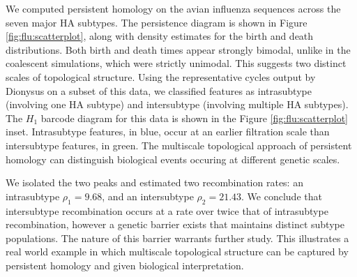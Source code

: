 We computed persistent homology on the avian influenza sequences across the seven major HA subtypes.
The persistence diagram is shown in Figure \ref{fig:flu:scatterplot}, along with density estimates for the birth and death distributions.
Both birth and death times appear strongly bimodal, unlike in the coalescent simulations, which were strictly unimodal.
This suggests two distinct scales of topological structure.
Using the representative cycles output by Dionysus on a subset of this data, we classified features as intrasubtype (involving one HA subtype) and intersubtype (involving multiple HA subtypes).
The $H_1$ barcode diagram for this data is shown in the Figure \ref{fig:flu:scatterplot} inset.
Intrasubtype features, in blue, occur at an earlier filtration scale than intersubtype features, in green.
The multiscale topological approach of persistent homology can distinguish biological events occuring at different genetic scales.

We isolated the two peaks and estimated two recombination rates: an intrasubtype $\rho_{1}=9.68$, and an intersubtype $\rho_{2}=21.43$.
We conclude that intersubtype recombination occurs at a rate over twice that of intrasubtype recombination, however a genetic barrier exists that maintains distinct subtype populations.
The nature of this barrier warrants further study.
This illustrates a real world example in which multiscale topological structure can be captured by persistent homology and given biological interpretation.

